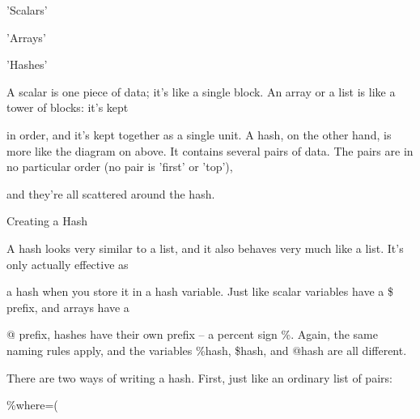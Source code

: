 \documentclass[a4paper,11pt]{book}
\begin{document}
\noindent 

\noindent 

\noindent 'Scalars'

\noindent 'Arrays'

\noindent 'Hashes'

\noindent 

\noindent 

\noindent 

\noindent 

\noindent 

\noindent 

\noindent 

\noindent 

\noindent 

\noindent 

\noindent 

\noindent 

\noindent A scalar is one piece of data; it's like a single block. An array or a list is like a tower of blocks: it's kept

\noindent in order, and it's kept together as a single unit. A hash, on the other hand, is more like the diagram on above. It contains several pairs of data. The pairs are in no particular order (no pair is 'first' or 'top'),

\noindent and they're all scattered around the hash.

\noindent 

\noindent Creating a Hash

\noindent 

\noindent A hash looks very similar to a list, and it also behaves very much like a list. It's only actually effective as

\noindent a hash when you store it in a hash variable. Just like scalar variables have a \$ prefix, and arrays have a

\noindent @ prefix, hashes have their own prefix -- a percent sign \%. Again, the same naming rules apply, and the variables \%hash, \$hash, and @hash are all different.

\noindent 

\noindent 

\noindent There are two ways of writing a hash. First, just like an ordinary list of pairs:

\noindent 

\noindent \%where=(

\noindent 

\noindent 

\noindent 
\end{document}
